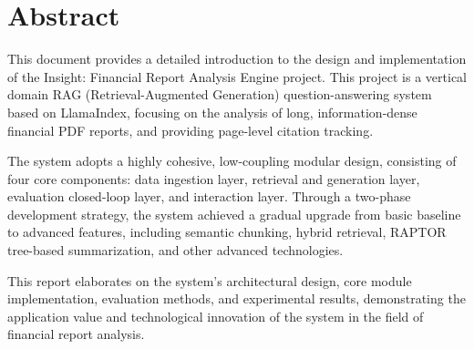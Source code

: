 \section{Abstract}

This document provides a detailed introduction to the design and implementation of the Insight: Financial Report Analysis Engine project. This project is a vertical domain RAG (Retrieval-Augmented Generation) question-answering system based on LlamaIndex, focusing on the analysis of long, information-dense financial PDF reports, and providing page-level citation tracking.

The system adopts a highly cohesive, low-coupling modular design, consisting of four core components: data ingestion layer, retrieval and generation layer, evaluation closed-loop layer, and interaction layer. Through a two-phase development strategy, the system achieved a gradual upgrade from basic baseline to advanced features, including semantic chunking, hybrid retrieval, RAPTOR tree-based summarization, and other advanced technologies.

This report elaborates on the system's architectural design, core module implementation, evaluation methods, and experimental results, demonstrating the application value and technological innovation of the system in the field of financial report analysis.

